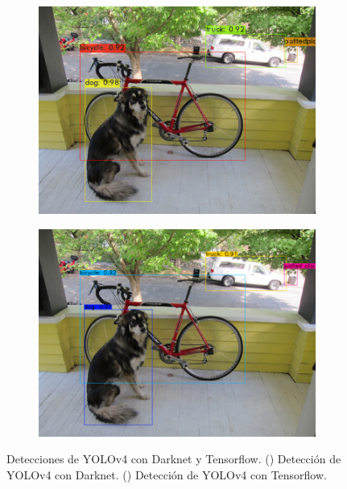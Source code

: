 \begin{figure}[ht]
  \centering
  \begin{subfigure}[b]{0.4\textwidth}
    \includegraphics[width=\textwidth]{img/chapters/desarrollo/predictions.jpg}
    \caption{}
    \label{fig:predictions-darknet}
  \end{subfigure}
  \qquad\qquad
  \begin{subfigure}[b]{0.4\textwidth}
    \includegraphics[width=\textwidth]{img/chapters/desarrollo/detection1.png}
    \caption{}
    \label{fig:predictions-tf}
  \end{subfigure}
  \caption{Detecciones de YOLOv4 con Darknet y Tensorflow.
    (\protect{}) Detección de YOLOv4 con Darknet.
    (\protect{}) Detección de YOLOv4 con Tensorflow.}
  \label{fig:predictions-darknet-tf}
\end{figure}

